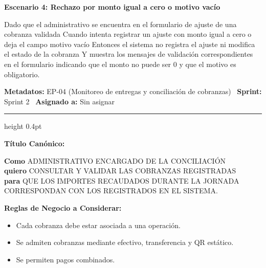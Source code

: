 \documentclass[a4paper,9pt]{article}
\begin{document}
\begin{tcolorbox}[hucard, title={\textbf{HU-58: AJUSTAR COBRANZA} \hfill \scriptsize \colorbox{bluestatus}{\textbf{\ New\ }} \quad \colorbox{white}{\textcolor{primarydark}{\textbf{\ 5 pts\ }}}}]
{\noindent\textbf{\textcolor{secondarydark}{Escenario 4:  Rechazo por monto igual a cero o motivo vacío}}\par\vspace{1pt}
Dado que el administrativo se encuentra en el formulario de ajuste de una cobranza validada Cuando intenta registrar un ajuste con monto igual a cero o deja el campo motivo vacío Entonces el sistema no registra el ajuste ni modifica el estado de la cobranza Y muestra los mensajes de validación correspondientes en el formulario indicando que el monto no puede ser 0 y que el motivo es obligatorio.\par\vspace{2.5pt}
}\par
\end{tcolorbox}

\begin{tcolorbox}[hucard, title={\textbf{HU-19: CONSULTAR Y VALIDAR COBRANZAS} \hfill \scriptsize \colorbox{redstatus}{\textbf{\ Rejected\ }} \quad \colorbox{white}{\textcolor{primarydark}{\textbf{\ 8 pts\ }}}}]
\vspace{-1pt}
\noindent\textbf{\footnotesize Metadatos:} EP-04 (Monitoreo de entregas y conciliación de cobranzas) \textbar\ \textbf{Sprint:} Sprint 2 \textbar\ \textbf{Asignado a:} Sin asignar\par\vspace{2pt}
\hrule height 0.4pt\par\vspace{3pt}
\noindent\textbf{\footnotesize Título Canónico:}\par\vspace{1pt}
{\small \textbf{Como} ADMINISTRATIVO ENCARGADO DE LA CONCILIACIÓN \\ \textbf{quiero} CONSULTAR Y VALIDAR LAS COBRANZAS REGISTRADAS \\ \textbf{para} QUE LOS IMPORTES RECAUDADOS DURANTE LA JORNADA CORRESPONDAN CON LOS REGISTRADOS EN EL SISTEMA.}\par\vspace{3pt}
\noindent\textbf{\footnotesize Reglas de Negocio a Considerar:}\par\vspace{1pt}
{\footnotesize
\begin{itemize}[leftmargin=12pt, nosep, itemsep=1.5pt, topsep=1pt]
\item Cada cobranza debe estar asociada a una operación.
\item Se admiten cobranzas mediante efectivo, transferencia y QR estático.
\item Se permiten pagos combinados.

\end{itemize}}
\end{tcolorbox}
\end{document}
